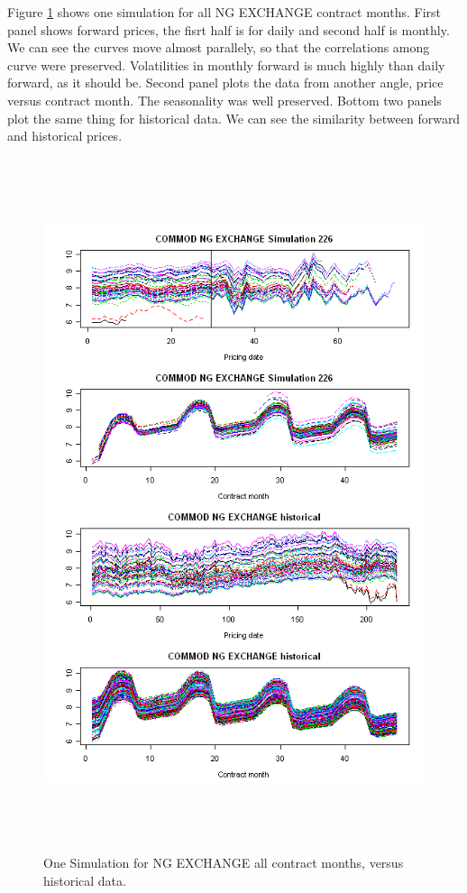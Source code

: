 Figure \ref{ng-allmon} shows one simulation for all NG EXCHANGE 
contract months. First panel shows forward prices, the fisrt half is 
for daily and  second half is monthly. We can see the curves 
move almost parallely, so that the correlations among curve 
were preserved. Volatilities in monthly forward
is much highly than daily forward, as it should be. 
Second panel plots the data from another angle, price versus contract 
month. The seasonality was well preserved. Bottom two panels plot the 
same thing for historical data. We can see the similarity 
between forward and historical prices.
\begin{figure}[htbp]
\centering
\includegraphics[width=5.5in, height=8in]{figures/ng-exchange-allmon.png}
\caption{One Simulation for NG EXCHANGE all contract months,
versus historical data.}
\label{ng-allmon}
\end{figure}

